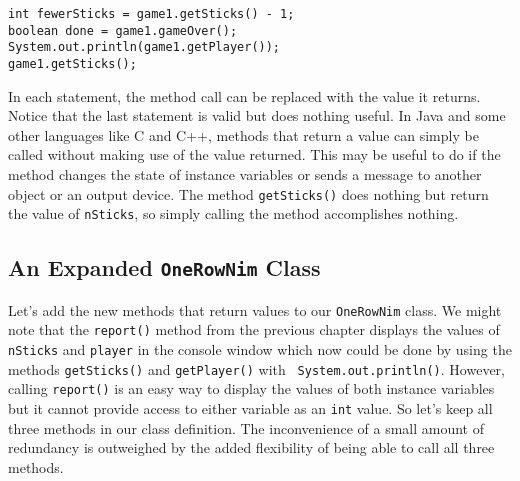 \begin{jjjlisting}
\begin{lstlisting}
int fewerSticks = game1.getSticks() - 1;
boolean done = game1.gameOver();
System.out.println(game1.getPlayer());
game1.getSticks();
\end{lstlisting}
\end{jjjlisting}


\noindent In each statement, the method call can be replaced
with the value it returns.  Notice that the last statement is valid
but does nothing useful. In Java and some other languages like C and
C++, methods that return a value can simply be called without making
use of the value returned.  This may be useful to do if the method
changes the state of instance variables or sends a message to another
object or an output device. The method {\tt getSticks()} does nothing
but return the value of {\tt nSticks}, so simply calling the method
accomplishes nothing.

\subsection{An Expanded {\tt OneRowNim} Class}

\noindent Let's add the new methods that return values to our
{\tt OneRowNim} class.  We might note that the {\tt report()} method
from the previous chapter displays the values of {\tt nSticks} and
{\tt player} in the console window which now could be done by using
the methods {\tt getSticks()} and {\tt getPlayer()} with {\tt
System.out.println()}.  However, calling {\tt report()} is an easy way
to display the values of both instance variables but it cannot provide
access to either variable as an {\tt int} value.
So let's keep all three methods in our class definition.  The
inconvenience of a small amount of redundancy is outweighed by the
added flexibility of being able to call all three methods.


